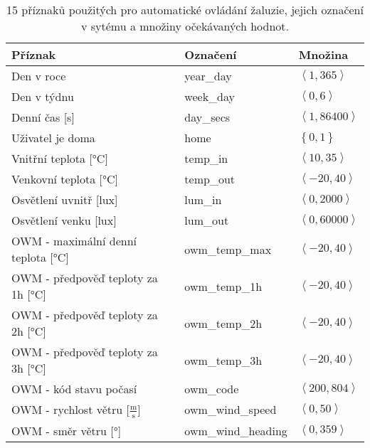 \begin{table}[htbp]
  \centering
    \begin{tabular}{l|l|l}
    Příznak & Označení & Množina \\
    \midrule
    \midrule
    Den v roce & year\_day & $\left\langle 1, 365\right\rangle $ \\
    \midrule
    Den v týdnu & week\_day & $\left\langle 0, 6\right\rangle $ \\
    \midrule
    Denní čas [s] & day\_secs & $\left\langle 1, 86400\right\rangle $ \\
    \midrule
    Uživatel je doma & home  & $\left\{  0,1\right\}  $ \\
    \midrule
    Vnitřní teplota  [°C]& temp\_in & $\left\langle 10, 35\right\rangle $ \\
    \midrule
    Venkovní teplota  [°C]& temp\_out & $\left\langle -20, 40\right\rangle $ \\
    \midrule
    Osvětlení uvnitř [lux]& lum\_in & $\left\langle 0, 2000\right\rangle $ \\
    \midrule
    Osvětlení venku [lux]& lum\_out & $\left\langle 0, 60000\right\rangle $ \\
    \midrule
    OWM - maximální denní teplota  [°C]& owm\_temp\_max & $\left\langle -20, 40\right\rangle $ \\
    \midrule
    OWM - předpověď teploty za 1h  [°C]& owm\_temp\_1h & $\left\langle -20, 40\right\rangle $ \\
    \midrule
    OWM -  předpověď teploty za 2h  [°C]& owm\_temp\_2h & $\left\langle -20, 40\right\rangle $ \\
    \midrule
    OWM -  předpověď teploty za 3h [°C] & owm\_temp\_3h & $\left\langle -20, 40\right\rangle $ \\
    \midrule
    OWM - kód stavu počasí & owm\_code & $\left\langle 200, 804\right\rangle $ \\
    \midrule
    OWM - rychlost větru  [$\frac{\mathrm{m}}{\mathrm{s}}$]& owm\_wind\_speed & $\left\langle 0, 50\right\rangle $ \\
    \midrule
    OWM - směr větru [°]& owm\_wind\_heading & $\left\langle 0, 359\right\rangle $ \\
    \bottomrule
    \bottomrule
    \end{tabular}%
    \caption[Příznaky pro automatické ovládání žaluzie]{15 příznaků použitých pro automatické ovládání žaluzie, jejich označení v sytému a množiny očekávaných hodnot.}
  \label{tab:features}%
\end{table}%
